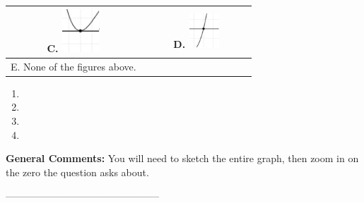 \documentclass{extbook}[14pt]
\begin{document}
\begin{tabular}{|c|c|}
 \textbf{C.} \includegraphics[width=0.3\textwidth]{../Figures/polyZeroBehaviorCB.png} & \textbf{D.} \includegraphics[width=0.3\textwidth]{../Figures/polyZeroBehaviorDB.png} \tabularnewline 
\hline 
 E. None of the figures above. & \tabularnewline 
\hline 
 \end{tabular} 
 
\begin{enumerate}[label=\Alph*.] 
\item   
\item   
\item   
\item   
\end{enumerate} 
 
\textbf{General Comments:} You will need to sketch the entire graph, then zoom in on the zero the question asks about.

-----------------------------------------------
\end{document}
